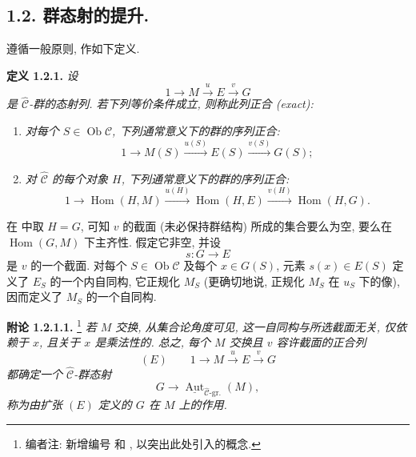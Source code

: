 \subsection*{1.2. 群态射的提升.\protect\footnotemark}
遵循一般原则, 作如下定义.

\medskip
\noindent{}\textbf{定义 1.2.1.}
\textit{设}
\[
 1\longrightarrow M\xrightarrow{u}E\xrightarrow{v}G
\]
\textit{是 \(\widehat{\mathscr C}\)-群的态射列.
若下列等价条件成立, 则称此列\emph{正合 (exact)}:}
\begin{enumerate}
 \item[(i)] \textit{对每个 \(S\in\operatorname{Ob}\mathscr C\),
 下列通常意义下的群的序列正合:}
 \[
  1\longrightarrow M(S)\xrightarrow{u(S)}E(S)
   \xrightarrow{v(S)}G(S);
 \]

 \item[\SGAInlineRefTarget{sga3:iii:definition:1-2-1:item:ii}(ii)]
 \textit{对 \(\widehat{\mathscr C}\) 的每个对象 \(H\),
 下列通常意义下的群的序列正合:}
 \[
  1\longrightarrow\operatorname{Hom}(H,M)
   \xrightarrow{u(H)}\operatorname{Hom}(H,E)
   \xrightarrow{v(H)}\operatorname{Hom}(H,G).
 \]
\end{enumerate}

在  中取 \(H=G\),
可知 \(v\) 的截面 (未必保持群结构) 所成的集合要么为空,
要么在 \(\operatorname{Hom}(G,M)\) 下主齐性. 假定它非空, 并设
\[
 s:G\longrightarrow E
\]
是 \(v\) 的一个截面. 对每个 \(S\in\operatorname{Ob}\mathscr C\)
及每个 \(x\in G(S)\), 元素 \(s(x)\in E(S)\) 定义了
\(E_S\) 的一个内自同构, 它正规化 \(M_S\)
(更确切地说, 正规化 \(M_S\) 在 \(u_S\) 下的像),
因而定义了 \(M_S\) 的一个自同构.

\medskip
\noindent{}\textbf{附论 1.2.1.1.}
\footnote{编者注: 新增编号 
和 ,
以突出此处引入的概念.}
\textit{若 \(M\) 交换, 从集合论角度可见, 这一自同构与所选截面无关,
仅依赖于 \(x\), 且关于 \(x\) 是乘法性的. 总之, 每个
\(M\) 交换且 \(v\) 容许截面的正合列}
\[
 (E)\qquad
 1\longrightarrow M\xrightarrow{u}E\xrightarrow{v}G
\]
\textit{都确定一个 \(\widehat{\mathscr C}\)-群态射}
\[
 G\longrightarrow
 \underline{\operatorname{Aut}}_{\widehat{\mathscr C}\text{-gr.}}(M),
\]
\textit{称为\emph{由扩张 \((E)\) 定义的 \(G\) 在 \(M\) 上的作用}.}


